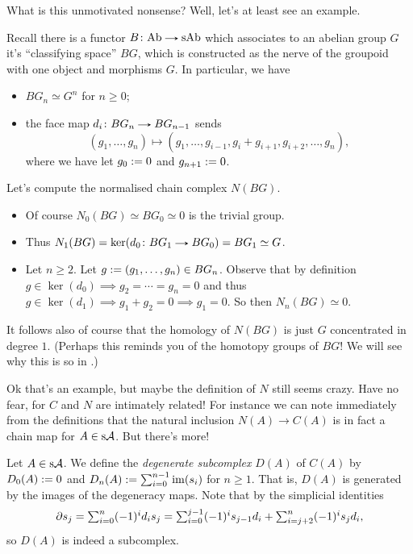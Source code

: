 What is this unmotivated nonsense? Well, let's at least see an example.

\begin{example}
  \label{BG}
  Recall there is a functor $B \c \Ab \to \s\Ab$ which associates to an
  abelian group $G$ it's ``classifying space'' $BG$, which is
  constructed as the nerve of the groupoid with one object and
  morphisms $G$. In particular, we have
  \begin{itemize}
  \item $BG_n \simeq G^n$ for $n \ge 0$;
  \item the face map $d_i \c BG_n \to BG_{n-1}$ sends
    \[
    (g_1,\ldots,g_n) \mapsto (g_1,\ldots,g_{i-1}, g_i + g_{i+1},
    g_{i+2}, \ldots, g_n),
    \]
    where we have let $g_0 \mathrel{:=} 0$ and $g_{n+1} \mathrel{:=} 0$.
  \end{itemize}
  Let's compute the normalised chain complex $N(BG)$.
  \begin{itemize}
  \item Of course $N_0(BG) \simeq BG_0 \simeq 0$ is the trivial group.
  \item Thus $N_1(BG) = \ker(d_0 \c BG_1 \to BG_0) = BG_1 \simeq G$.
  \item Let $n \ge 2$. Let $g \mathrel{:=} (g_1, \ldots, g_n) \in
    BG_n$. Observe that by definition $g \in \ker(d_0) \implies g_2 =
    \cdots = g_n = 0$ and thus $g \in \ker(d_1) \implies g_1 + g_2 = 0
    \implies g_1 = 0$. So then $N_n(BG) \simeq 0$.
  \end{itemize}
  It follows also of course that the homology of $N(BG)$ is just $G$
  concentrated in degree $1$. (Perhaps this reminds you of the
  homotopy groups of $BG$! We will see why this is so in .)
\end{example}

Ok that's an example, but maybe the definition of $N$ still seems
crazy. Have no fear, for $C$ and $N$ are intimately related! For
instance we can note immediately from the definitions that the natural
inclusion $N(A) \to C(A)$ is in fact a chain map for $A \in \mathrm{s}\mathcal{A}$. But
there's more!

\begin{definition}
  Let $A \in \mathrm{s}\mathcal{A}$. We define the \textit{degenerate subcomplex}
  $D(A)$ of $C(A)$ by $D_0(A) \mathrel{:=} 0$ and $D_n(A) \mathrel{:=}
  \sum_{i=0}^{n-1} \operatorname{im}(s_i)$ for $n \ge 1$. That is, $D(A)$ is
  generated by the images of the degeneracy maps. Note that by the
  simplicial identities
  \[
  \textstyle{\partial s_j = \sum_{i=0}^n (-1)^i d_i s_j = \sum_{i=0}^{j-1}
    (-1)^i s_{j-1} d_i + \sum_{i=j+2}^n (-1)^i s_j d_i,}
  \]
  so $D(A)$ is indeed a subcomplex.
\end{definition}

